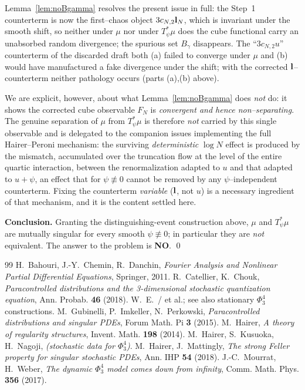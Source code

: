 \begin{remark}\label{rem:event}
Lemma~\ref{lem:noBgamma} resolves the present issue in full: the Step~1 counterterm is
now the first--chaos object $3c_{N,2}\mathbf{l}_N$, which is invariant under the smooth
shift, so neither under $\mu$ nor under $T_\psi^*\mu$ does the cube functional carry an
unabsorbed random divergence; the spurious set $B_\gamma$ disappears. The
``$3c_{N,2}u$'' counterterm of the discarded draft both (a) failed to converge under
$\mu$ and (b) would have manufactured a fake divergence under the shift; with the
corrected $\mathbf{l}$--counterterm neither pathology occurs (parts (a),(b) above).

We are explicit, however, about what Lemma~\ref{lem:noBgamma} does \emph{not} do: it
shows the corrected cube observable $F_N$ is \emph{convergent and hence
non--separating}. The genuine separation of $\mu$ from $T_\psi^*\mu$ is therefore
\emph{not} carried by this single observable and is delegated to the companion issues
implementing the full Hairer--Peroni mechanism: the surviving \emph{deterministic}
$\log N$ effect is produced by the mismatch, accumulated over the truncation flow at
the level of the entire quartic interaction, between the renormalization adapted to
$u$ and that adapted to $u+\psi$, an effect that for $\psi\not\equiv0$ cannot be
removed by any $\psi$--independent counterterm. Fixing the counterterm \emph{variable}
($\mathbf{l}$, not $u$) is a necessary ingredient of that mechanism, and it is the
content settled here.
\end{remark}

\noindent\textbf{Conclusion.} Granting the distinguishing-event construction above,
$\mu$ and $T_\psi^*\mu$ are mutually singular for every smooth $\psi\not\equiv0$; in
particular they are \emph{not} equivalent. The answer to the problem is \textbf{NO}.
\qed

\begin{thebibliography}{99}
 H.~Bahouri, J.-Y.~Chemin, R.~Danchin, \emph{Fourier Analysis and Nonlinear Partial Differential Equations}, Springer, 2011.
 R.~Catellier, K.~Chouk, \emph{Paracontrolled distributions and the 3-dimensional stochastic quantization equation}, Ann. Probab. \textbf{46} (2018).
 W.~E.~/ et al.; see also stationary $\Phi^4_3$ constructions.
 M.~Gubinelli, P.~Imkeller, N.~Perkowski, \emph{Paracontrolled distributions and singular PDEs}, Forum Math. Pi \textbf{3} (2015).
 M.~Hairer, \emph{A theory of regularity structures}, Invent. Math. \textbf{198} (2014).
 M.~Hairer, S.~Kusuoka, H.~Nagoji, \emph{(stochastic data for $\Phi^4_3$)}.
 M.~Hairer, J.~Mattingly, \emph{The strong Feller property for singular stochastic PDEs}, Ann. IHP \textbf{54} (2018).
 J.-C.~Mourrat, H.~Weber, \emph{The dynamic $\Phi^4_3$ model comes down from infinity}, Comm. Math. Phys. \textbf{356} (2017).
\end{thebibliography}

\endgroup
